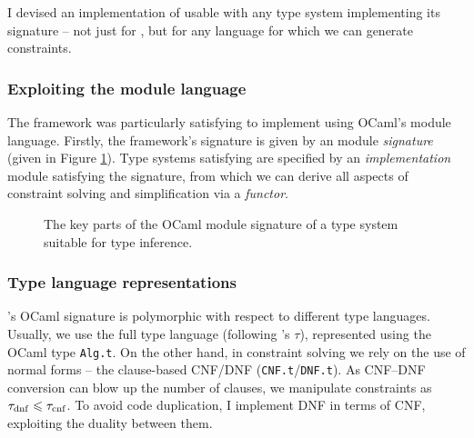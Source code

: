I devised an implementation of \inference{} usable with any type system implementing its signature -- not just for \fabric{}, but for any language for which we can generate constraints.

\subsubsection{Exploiting the module language} The framework was particularly satisfying to implement using OCaml's module language. Firstly, the framework's signature is given by an module \emph{signature} (given in Figure \ref{fig:inference-signature}). Type systems satisfying are specified by an \emph{implementation} module satisfying the signature, from which we can derive all aspects of constraint solving and simplification via a \emph{functor}.

\begin{figure}[p]
    \centering
    
    \caption{The key parts of the OCaml module signature of a type system suitable for type inference.}
    \label{fig:inference-signature}
\end{figure}

\subsubsection{Type language representations} \inference{}'s OCaml signature is polymorphic with respect to different type languages. 
Usually, we use the full type language (following \inference{}'s $\tau$), represented using the OCaml type \texttt{Alg.t}. On the other hand, in constraint solving we rely on the use of normal forms -- the clause-based CNF/DNF (\texttt{CNF.t}/\texttt{DNF.t}). As CNF--DNF conversion can blow up the number of clauses, we manipulate constraints as $\tau_\mathrm{dnf} \leqslant \tau_\mathrm{cnf}$. To avoid code duplication, I implement DNF in terms of CNF, exploiting the duality between them. 


